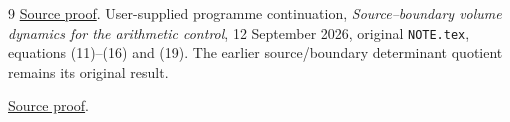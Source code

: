 \begin{thebibliography}{9}
\href{https://github.com/KokunoYumeto/zeta-function-research-reader/blob/5992ad50c0f2a06921f1fcaded7b4e38097c0739/workbenches/splitzero-tandem/continuations/20260920-original-kernel-mixed-determinants/MIXED_CONFLUENT_PROOF.tex\#L1}{Source proof}.
 User-supplied programme continuation,
\emph{Source--boundary volume dynamics for the arithmetic control},
12 September 2026, original \texttt{NOTE.tex}, equations (11)--(16)
and (19). The earlier source/boundary determinant quotient remains
its original result.

\href{https://github.com/KokunoYumeto/zeta-function-research-reader/blob/5992ad50c0f2a06921f1fcaded7b4e38097c0739/workbenches/splitzero-tandem/continuations/20260920-original-kernel-mixed-determinants/providers/TODA_VOLUME_CONTROL.tex\#L1}{Source proof}.
\end{thebibliography}

\endgroup

